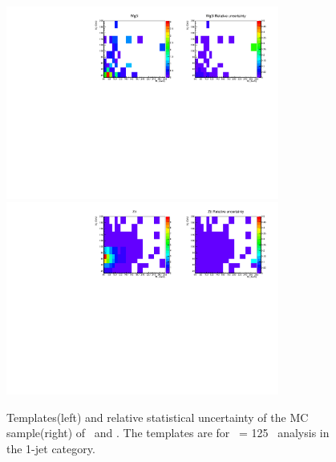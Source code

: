 \begin{figure}[htp]
\centering
\includegraphics[width=0.8\textwidth]{figures/2dtemplate_Wg3l_mH125_1j.pdf}
\includegraphics[width=0.8\textwidth]{figures/2dtemplate_Ztt_mH125_1j.pdf}
\caption{Templates(left) and relative statistical uncertainty of the MC sample(right) 
of \wgammastar\ and \ztt. 
The templates are for \mHi\ = 125 \GeV\ analysis in the 1-jet category.}
\label{fig:2dtemplate_125_1j_4}
\end{figure} 


